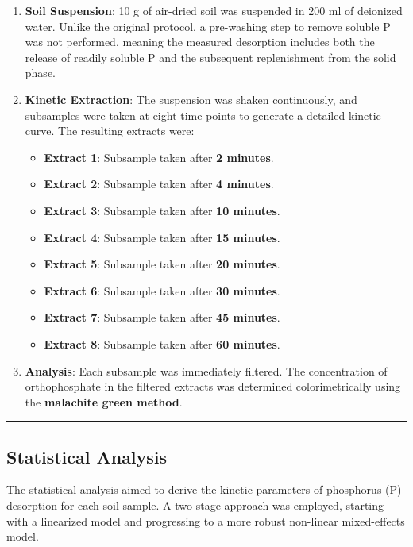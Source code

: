 \documentclass[
  letterpaper,
  DIV=11,
  numbers=noendperiod]{scrartcl}
\providecommand{\tightlist}{%
  \setlength{\itemsep}{0pt}\setlength{\parskip}{0pt}}\usepackage{longtable,booktabs,array}
\begin{document}
\begin{enumerate}
\def\labelenumi{\arabic{enumi}.}
\item
  \textbf{Soil Suspension}: 10 g of air-dried soil was suspended in 200
  ml of deionized water. Unlike the original protocol, a pre-washing
  step to remove soluble P was not performed, meaning the measured
  desorption includes both the release of readily soluble P and the
  subsequent replenishment from the solid phase.
\item
  \textbf{Kinetic Extraction}: The suspension was shaken continuously,
  and subsamples were taken at eight time points to generate a detailed
  kinetic curve. The resulting extracts were:

  \begin{itemize}
  \tightlist
  \item
    \textbf{Extract 1}: Subsample taken after \textbf{2 minutes}.
  \item
    \textbf{Extract 2}: Subsample taken after \textbf{4 minutes}.
  \item
    \textbf{Extract 3}: Subsample taken after \textbf{10 minutes}.
  \item
    \textbf{Extract 4}: Subsample taken after \textbf{15 minutes}.
  \item
    \textbf{Extract 5}: Subsample taken after \textbf{20 minutes}.
  \item
    \textbf{Extract 6}: Subsample taken after \textbf{30 minutes}.
  \item
    \textbf{Extract 7}: Subsample taken after \textbf{45 minutes}.
  \item
    \textbf{Extract 8}: Subsample taken after \textbf{60 minutes}.
  \end{itemize}
\item
  \textbf{Analysis}: Each subsample was immediately filtered. The
  concentration of orthophosphate in the filtered extracts was
  determined colorimetrically using the \textbf{malachite green method}.
\end{enumerate}

\begin{center}\rule{0.5\linewidth}{0.5pt}\end{center}

\subsection{Statistical Analysis}\label{statistical-analysis}

The statistical analysis aimed to derive the kinetic parameters of
phosphorus (P) desorption for each soil sample. A two-stage approach was
employed, starting with a linearized model and progressing to a more
robust non-linear mixed-effects model.
\end{document}
